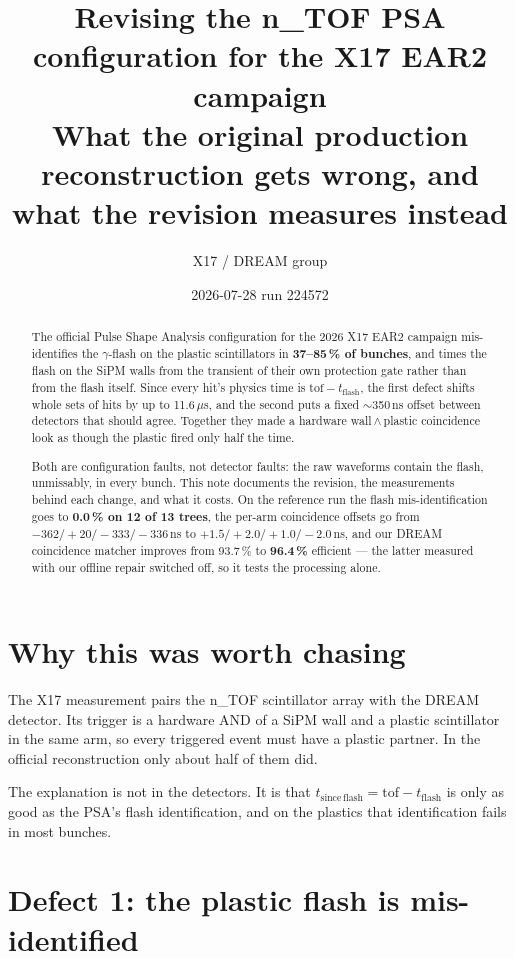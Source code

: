 \documentclass[11pt,a4paper]{article}
\title{\textbf{Revising the n\_TOF PSA configuration for the X17 EAR2 campaign}\\
\large What the original production reconstruction gets wrong, and what the
revision measures instead}
\author{X17 / DREAM group}
\date{2026-07-28 \quad run 224572}
\newcommand{\us}{\,$\mu$s}
\begin{document}
\maketitle

\begin{abstract}
\noindent
The official Pulse Shape Analysis configuration for the 2026 X17 EAR2 campaign
mis-identifies the $\gamma$-flash on the plastic scintillators in
\textbf{37--85\,\% of bunches}, and times the flash on the SiPM walls from the
transient of their own protection gate rather than from the flash itself. Since
every hit's physics time is $\mathrm{tof}-t_{\mathrm{flash}}$, the first defect
shifts whole sets of hits by up to 11.6\us, and the second puts a fixed
$\sim$350\,ns offset between detectors that should agree. Together they made a
hardware wall\,$\wedge$\,plastic coincidence look as though the plastic fired
only half the time.

Both are configuration faults, not detector faults: the raw waveforms contain
the flash, unmissably, in every bunch. This note documents the revision, the
measurements behind each change, and what it costs. On the reference run the
flash mis-identification goes to \textbf{0.0\,\% on 12 of 13 trees}, the
per-arm coincidence offsets go from $-362/{+}20/{-}333/{-}336$\,ns to
$+1.5/{+}2.0/{+}1.0/{-}2.0$\,ns, and our DREAM coincidence matcher improves
from 93.7\,\% to \textbf{96.4\,\%} efficient --- the latter measured with our
offline repair switched off, so it tests the processing alone.
\end{abstract}

\section{Why this was worth chasing}

The X17 measurement pairs the n\_TOF scintillator array with the DREAM
detector. Its trigger is a hardware AND of a SiPM wall and a plastic
scintillator in the same arm, so every triggered event must have a plastic
partner. In the official reconstruction only about half of them did.

The explanation is not in the detectors. It is that
$t_{\mathrm{since\,flash}} = \mathrm{tof}-t_{\mathrm{flash}}$ is only as good
as the PSA's flash identification, and on the plastics that identification
fails in most bunches.

\section{Defect 1: the plastic flash is mis-identified}
\end{document}
